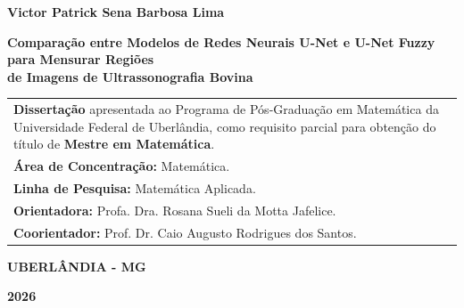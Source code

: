 \begin{center}
\textbf{Victor Patrick Sena Barbosa Lima}

\vspace{5cm}

{\LARGE \textbf{Comparação entre Modelos de Redes Neurais  U-Net e U-Net Fuzzy para Mensurar Regiões \\ \vspace{0.4cm} de Imagens de Ultrassonografia Bovina}}


\vspace{5cm}

\hfill
\begin{tabular}{p{12cm}}
\textbf{Dissertação} apresentada ao Programa de Pós-Graduação em Matemática da Universidade Federal de Uberlândia, como requisito parcial para obtenção do título de \textbf{Mestre em Matemática}. \\
\vspace{1cm}
\textbf{Área de Concentração:} Matemática. \\
\textbf{Linha de Pesquisa:} Matemática Aplicada.\\
\vspace{1cm}
\textbf{Orientadora:} Profa. Dra. Rosana Sueli da Motta Jafelice.\\
\textbf{Coorientador:} Prof. Dr. Caio Augusto Rodrigues dos Santos.
\end{tabular}


\vspace{3.5cm}

\textbf{UBERLÂNDIA - MG}

\textbf{2026}
\end{center}